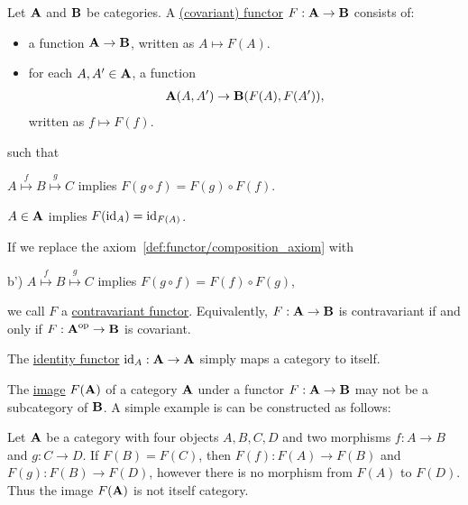 \begin{definition}\label{def:functor}\cite[definitions 1.2.1, 1.2.10]{Leinster2014}
  Let $\operatorname{\mathbf{A}}$ and $\operatorname{\mathbf{B}}$ be categories. A \uline{(covariant) functor} $F: \operatorname{\mathbf{A}} \to \operatorname{\mathbf{B}}$ consists of:
  \begin{itemize}
    \item a function $\operatorname{\mathbf{A}} \to \operatorname{\mathbf{B}}$, written as $A \mapsto F(A)$.
    \item for each $A, A' \in \operatorname{\mathbf{A}}$, a function
    \begin{align*}
      \operatorname{\mathbf{A}}(A, A') \to \operatorname{\mathbf{B}}(F(A), F(A')),
    \end{align*}
    written as $f \mapsto F(f)$.
  \end{itemize}
  such that
  \begin{defenum}
    \item\label{def:functor/composition_axiom} $A \overset f \mapsto B \overset g \mapsto C$ implies $F(g \circ f) = F(g) \circ F(f)$.
    \item\label{def:functor/identity_axiom} $A \in \operatorname{\mathbf{A}}$ implies $F(\operatorname{id}_A) = \operatorname{id}_{F(A)}$.
  \end{defenum}

  If we replace the axiom~\cref{def:functor/composition_axiom} with
  \begin{defenum}
    \item[b')]\label{def:functor/contravariant_composition_axiom} $A \overset f \mapsto B \overset g \mapsto C$ implies $F(g \circ f) = F(f) \circ F(g)$,
  \end{defenum}
  we call $F$ a \uline{contravariant functor}. Equivalently, $F: \operatorname{\mathbf{A}} \to \operatorname{\mathbf{B}}$ is contravariant if and only if $F: \operatorname{\mathbf{A}}^{\operatorname{op}} \to \operatorname{\mathbf{B}}$ is covariant.

  The \uline{identity functor} $\operatorname{id}_A: \operatorname{\mathbf{A}} \to \operatorname{\mathbf{A}}$ simply maps a category to itself.
\end{definition}

\begin{note}\label{note:image_of_functor_maybe_not_subcategory}
  The \uline{image} $F(\operatorname{\mathbf{A}})$ of a category $\operatorname{\mathbf{A}}$ under a functor $F: \operatorname{\mathbf{A}} \to \operatorname{\mathbf{B}}$ may not be a subcategory of $\operatorname{\mathbf{B}}$. A simple example is can be constructed as follows:

  Let $\operatorname{\mathbf{A}}$ be a category with four objects $A, B, C, D$ and two morphisms $f: A \to B$ and $g: C \to D$. If $F(B) = F(C)$, then $F(f): F(A) \to F(B)$ and $F(g): F(B) \to F(D)$, however there is no morphism from $F(A)$ to $F(D)$. Thus the image $F(\operatorname{\mathbf{A}})$ is not itself category.
\end{note}

